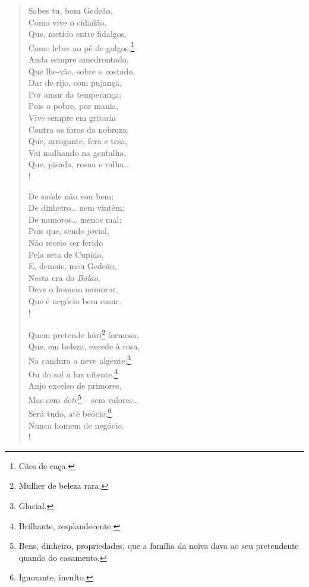 \begin{verse}
Sabes tu, bom Gedeão,\\
Como vive o cidadão,\\
Que, metido entre fidalgos,\\
Como lebre ao pé de galgos,\footnote{ Cães de caça.}\\
Anda sempre amedrontado,\\
Que lhe-vão, sobre o costado,\\
Dar de rijo, com pujança,\\
Por amor da temperança;\\
Pois o pobre, por mania,\\
Vive sempre em gritaria\\
Contra os foros da nobreza,\\
Que, arrogante, fera e tesa,\\
Vai malhando na gentalha,\\
Que, pisada, rosna e ralha\ldots{}\\!

De saúde não vou bem;\\
De dinheiro\ldots{} nem vintém;\\
De namoros\ldots{} menos mal;\\
Pois que, sendo jovial,\\
Não receio ser ferido\\
Pela seta de Cupido.\\
E, demais, meu Gedeão,\\
Nesta era do \emph{Balão},\\
Deve o homem namorar,\\
Que é negócio bem casar.\\!

Quem pretende húri\footnote{ Mulher de beleza rara.} formosa,\\
Que, em beleza, excede à rosa,\\
Na candura a neve algente,\footnote{ Glacial.}\\
Ou do sol a luz nitente,\footnote{ Brilhante, resplandecente.}\\
Anjo excelso de primores,\\
Mas sem \emph{dote}\footnote{ Bens, dinheiro, propriedades, que a
          família da noiva dava ao seu pretendente quando do casamento.}
-- sem valores\ldots{}\\
Será tudo, até beócio;\footnote{ Ignorante, inculto.}\\
Nunca homem de negócio.\\!


\end{verse}

